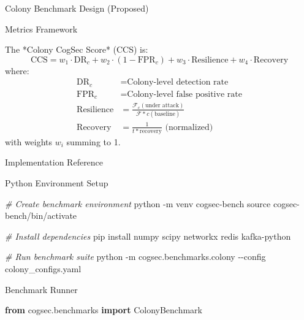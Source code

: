 \documentclass[
  ignorenonframetext,
]{beamer}
\newenvironment{Shaded}{}{}
\newcommand{\AttributeTok}[1]{\textcolor[rgb]{0.49,0.56,0.16}{#1}}
\newcommand{\BuiltInTok}[1]{\textcolor[rgb]{0.00,0.50,0.00}{#1}}
\newcommand{\CommentTok}[1]{\textcolor[rgb]{0.38,0.63,0.69}{\textit{#1}}}
\newcommand{\ExtensionTok}[1]{#1}
\newcommand{\ImportTok}[1]{\textcolor[rgb]{0.00,0.50,0.00}{\textbf{#1}}}
\newcommand{\NormalTok}[1]{#1}
\begin{document}
\begin{frame}[fragile]{Colony Benchmark Design (Proposed)}
\begin{block}{Metrics Framework}
\begin{definition}
\label{def:cogsec-score-impl}
The *Colony CogSec Score* (CCS) is:
\begin{equation}
\label{eq:ccs-impl}
\text{CCS} = w_1 \cdot \text{DR}_c + w_2 \cdot (1 - \text{FPR}_c) + w_3 \cdot \text{Resilience} + w_4 \cdot \text{Recovery}
\end{equation}
where:
\begin{align}
\text{DR}_c &= \text{Colony-level detection rate} \\
\text{FPR}_c &= \text{Colony-level false positive rate} \\
\text{Resilience} &= \frac{\mathcal{F}_c(\text{under attack})}{\mathcal{F}*c(\text{baseline})} \\
\text{Recovery} &= \frac{1}{t*{\text{recovery}}} \text{ (normalized)}
\end{align}
with weights $w_i$ summing to 1.
\end{definition}
\end{block}

\begin{block}{Implementation Reference}
\protect{}\label{implementation-reference}
\begin{block}{Python Environment Setup}
\protect{}\label{python-environment-setup}
\begin{Shaded}
\begin{Highlighting}[]
\CommentTok{\# Create benchmark environment}
\ExtensionTok{python} \AttributeTok{{-}m}\NormalTok{ venv cogsec{-}bench}
\BuiltInTok{source}\NormalTok{ cogsec{-}bench/bin/activate}

\CommentTok{\# Install dependencies}
\ExtensionTok{pip}\NormalTok{ install numpy scipy networkx redis kafka{-}python}

\CommentTok{\# Run benchmark suite}
\ExtensionTok{python} \AttributeTok{{-}m}\NormalTok{ cogsec.benchmarks.colony }\AttributeTok{{-}{-}config}\NormalTok{ colony\_configs.yaml}
\end{Highlighting}
\end{Shaded}
\end{block}

\begin{block}{Benchmark Runner}
\protect{}\label{benchmark-runner}
\begin{Shaded}
\begin{Highlighting}[]
\ImportTok{from}\NormalTok{ cogsec.benchmarks }\ImportTok{import}\NormalTok{ ColonyBenchmark}


\end{Highlighting}
\end{Shaded}
\end{block}
\end{block}
\end{frame}
\end{document}
